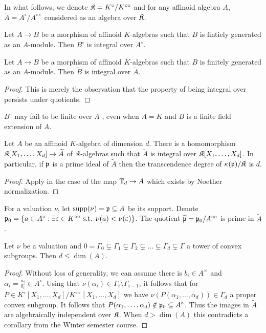 In what follows, we denote $\mathfrak{K}=K^{\circ}/K^{\circ\circ}$ and for any affinoid algebra $A$, $\widetilde{A}=A^{\circ}/A^{\circ\circ}$ considered as an algebra over $\mathfrak{K}$. 
\begin{proposition}
    Let $A\to B$ be a morphism of affinoid $K$-algebras such that $B$ is fintiely generated as an $A$-module. Then $B^{\circ}$ is integral over $A^{\circ}$. 
\end{proposition}
\begin{proposition}\label{prop: integral over for fg modules}
    Let $A\to B$ be a morphism of affinoid $K$-algebras such that $B$ is finitely generated as an $A$-module. Then $\widetilde{B}$ is integral over $\widetilde{A}$. 
\end{proposition}
\begin{proof}
    This is merely the observation that the property of being integral over persists under quotients. 
\end{proof}
\begin{remark}
    $B^{\circ}$ may fail to be finite over $A^{\circ}$, even when $A=K$ and $B$ is a finite field extension of $A$. 
\end{remark}
\begin{corollary}
    Let $A$ be an affinoid $K$-algebra of dimension $d$. There is a homomorphism $\mathfrak{K}[X_{1},\dots,X_{d}]\to \widetilde{A}$ of $\mathfrak{K}$-algebras such that $\widetilde{A}$ is integral over $\mathfrak{K}[X_{1},\dots,X_{d}]$. In particular, if $\mathfrak{p}$ is a prime ideal of $\widetilde{A}$ then the transcendence degree of $\kappa(\mathfrak{p})/\mathfrak{K}$ is $d$. 
\end{corollary}
\begin{proof}
    Apply  in the case of the map $\mathbb{T}_{d}\to A$ which exists by Noether normalization. 
\end{proof}
For a valuation $\nu$, let $\mathrm{supp}(\nu)=\mathfrak{p}\subseteq A$ be its support. Denote $\mathfrak{p}_{0}=\{a\in A^{\circ}:\exists\varepsilon\in K^{\circ\circ}\text{ s.t. }\nu(a)<\nu(\varepsilon)\}$. The quotient $\widetilde{\mathfrak{p}}=\mathfrak{p}_{0}/A^{\circ\circ}$ is prime in $\widetilde{A}$. 
\begin{proposition}\label{prop: Krull dimension statement}
    Let $\nu$ be a valuation and $0=\Gamma_{0}\subsetneq\Gamma_{1}\subsetneq\Gamma_{2}\subsetneq\dots\subsetneq\Gamma_{d}\subsetneq\Gamma$ a tower of convex subgroups. Then $d\leq \dim(A)$.  
\end{proposition}
\begin{proof}
    Without loss of generality, we can assume there is $b_{i}\in A^{\times}$ and $\alpha_{i}=\frac{a_{i}}{b_{i}}\in A^{\circ}$. Using that $\nu(\alpha_{i})\in\Gamma_{i}\setminus\Gamma_{i-1}$, it follows that for $P\in K^{\circ}[X_{1},\dots,X_{d}]/K^{\circ\circ}[X_{1},\dots,X_{d}]$ we have $\nu(P(\alpha_{1},\dots,\alpha_{d}))\in\Gamma_{d}$ a proper convex subgroup. It follows that $P(\alpha_{1},\dots,\alpha_{d})\notin\mathfrak{p}_{0}\subseteq A^{\circ}$. Thus the images in $\widetilde{A}$ are algebraically independent over $\mathfrak{K}$. When $d>\dim(A)$ this contradicts a corollary from the Winter semester course. 
\end{proof}
